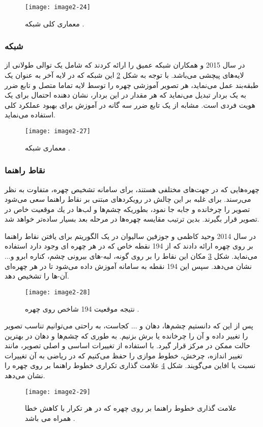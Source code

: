 \begin{figure}[h]
\centering
  \texttt{[image: image2-24]}
  \caption{معماری کلی شبکه  \cite{7298594}.}
  \label{image2-24}
\end{figure}

\subsubsection{	شبکه }
در سال 2015  و همکاران \cite{parkhi2015deep} شبکه عمیق  را ارائه کردند که شامل یک توالی طولانی از لایه‌های پیچشی می‌باشد. با توجه به شکل \ref{image2-27} این شبکه که در لایه آخر به عنوان یک طبقه‌بند عمل می‌نماید، هر تصویر آموزشی چهره را توسط لایه تماما متصل و تابع ضرر  به یک بردار تبدیل می‌نماید که هر مقدار در این بردار، نشان دهنده احتمال برای یک هویت فردی است.  مشابه  از یک تابع ضرر سه گانه  در آموزش برای بهبود عملکرد کلی استفاده می‌نماید.
 
\begin{figure}[h]
\centering
  \texttt{[image: image2-27]}
  \caption{معماری شبکه  \cite{parkhi2015deep}.}
  \label{image2-27}
\end{figure}

\subsubsection{نقاط راهنما} 
چهره‌هایى كه در جهت‌هاى مختلفى هستند، براى سامانه تشخیص چهره، متفاوت به نظر می‌رسند. براى غلبه بر این چالش در رویکردهای مبتنی بر نقاط راهنما سعى می‌شود تصویر را چرخانده و جابه جا نمود، بطوریكه چشم‌ها و لب‌ها در یك موقعیت خاص در تصویر قرار بگیرند. بدین ترتیب مقایسه چهره‌ها در مرحله بعد بسیار ساده‌تر خواهد شد.

\noindent 
در سال 2014 وحید كاظمى و جوزفین سالیوان در \cite{6909637} یک الگوریتم برای یافتن نقاط راهنما  بر روی چهره ارائه دادند كه از 194 نقطه خاص كه در هر چهره اى وجود دارد استفاده می‌نماید. شکل \ref{image2-28} مکان این نقاط را بر روی گونه، لبه-هاى بیرونی چشم، كناره ابرو و... نشان می‌دهد. سپس این 194 نقطه به سامانه آموزش داده می‌شود تا در هر چهره‌اى آن-ها را تشخیص دهد. 
\begin{figure}[h]
\centering
  \texttt{[image: image2-28]}
  \caption{نتیجه موقعیت 194 شاخص روی چهره \cite{6909637}.}
  \label{image2-28}
\end{figure}

\noindent
پس از این که دانستیم چشم‌ها، دهان و ... کجاست، به راحتی می‌توانیم تناسب تصویر را تغییر داده و آن را چرخانده یا برش بزنیم. به طوری که چشم‌ها و دهان در بهترین حالت ممکن در مرکز قرار گیرد. با استفاده از تغییرات اساسی و اصلی تصویر، مانند تغییر اندازه، چرخش، خطوط موازی را حفظ می‌کنیم که در ریاضی به آن تغییرات نسبت یا افاین می‌گویند. شکل \ref{image2-29} علامت گذاری تکراری خطوط راهنما بر روی چهره را نشان می‌دهد. 
\begin{figure}[h]
\centering
  \texttt{[image: image2-29]}
  \caption{علامت گذاری خطوط راهنما بر روی چهره که در هر تکرار با کاهش خطا همراه می باشد \cite{6909637}.}
  \label{image2-29}
\end{figure}

